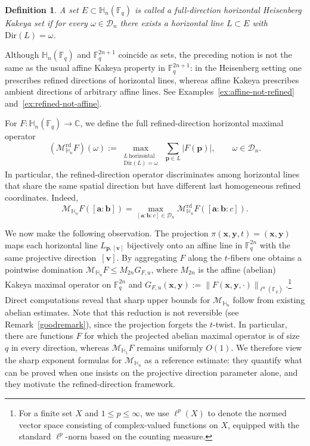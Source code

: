 \documentclass[11pt]{article}
\newtheorem{definition}[theorem]{Definition}
\newcommand{\1}{\mathbf 1}
\begin{document}
\begin{definition}\label{def:slope-refined-kakeya}
A set \(E\subset \mathbb H_n(\mathbb F_q)\) is called a full-direction horizontal Heisenberg Kakeya set if for every
\(\omega\in\mathcal D_n\) there exists a horizontal line \(L\subset E\) with \(\mathrm{Dir}(L)=\omega\).
\end{definition}

Although \(\mathbb H_n(\mathbb F_q)\) and \(\mathbb F_q^{2n+1}\) coincide as sets, the preceding notion is not the same as the usual affine Kakeya
property in \(\mathbb F_q^{2n+1}\): in the Heisenberg setting one prescribes refined directions of horizontal lines, whereas affine Kakeya prescribes
ambient directions of arbitrary affine lines. See Examples~\ref{ex:affine-not-refined} and~\ref{ex:refined-not-affine}.

For \(F:\mathbb H_n(\mathbb F_q)\to\mathbb C\), we define the full refined-direction horizontal maximal operator
\begin{equation}\label{eq:Mrd}
(\mathcal{M}^{\mathrm{rd}}_{\mathbb H_n}F)(\omega)
:=
\max_{\substack{L\ \mathrm{horizontal}\\ \mathrm{Dir}(L)=\omega}}
\ \sum_{\mathbf p\in L}|F(\mathbf p)|,
\qquad
\omega\in\mathcal D_n.
\end{equation}
{ 
In particular, the refined-direction operator discriminates among horizontal lines that share the same spatial direction but have different last homogeneous refined coordinates. Indeed, 
\[
\mathcal{M}_{\mathbb H_n}F([\mathbf a:\mathbf b])
=
\max_{[\mathbf a:\mathbf b:c]\in\mathcal D_n}
\mathcal{M}^{\mathrm{rd}}_{\mathbb H_n}F([\mathbf a:\mathbf b:c]).
\]
}

We now make the following observation. The projection $\pi(\mathbf{x},\mathbf{y},t)=(\mathbf{x},\mathbf{y})$
maps each horizontal line $L_{\mathbf{p},[\mathbf{v}]}$ bijectively onto an affine line in $\mathbb{F}_q^{2n}$ with the same projective direction~$[\mathbf{v}]$.
By aggregating $F$ along the $t$-fibers one obtains a pointwise domination
$\mathcal{M}_{\mathbb{H}_n}F\leq M_{2n}G_{F,u}$,
where $M_{2n}$ is the affine (abelian) Kakeya maximal operator on $\mathbb{F}_q^{2n}$ and $G_{F,u}(\mathbf{x},\mathbf{y}):=
\|F(\mathbf{x},\mathbf{y},\cdot)\|_{\ell^u(\mathbb{F}_q)}$.\footnote{For a finite set $X$ and $1\leq p\leq \infty$, we use $\ell^p(X)$ to denote the normed vector space consisting of complex-valued functions on $X$, equipped with the standard $\ell^p$-norm based on the counting measure.} Direct computations reveal that
sharp upper bounds for $\mathcal{M}_{\mathbb{H}_n}$ follow from existing abelian estimates. Note that this reduction is not reversible (see Remark~\ref{goodremark}), since the projection forgets the $t$-twist. In particular, there are functions $F$ for which the projected abelian maximal operator is of size $q$ in every direction, whereas $\mathcal M_{\mathbb H_1}F$ remains uniformly $O(1)$. We therefore view the sharp exponent formulas for $\mathcal{M}_{\mathbb{H}_n}$
as a reference estimate: they quantify what can be proved when one insists on the projective direction parameter alone, and they motivate the
refined-direction framework.
\end{document}
